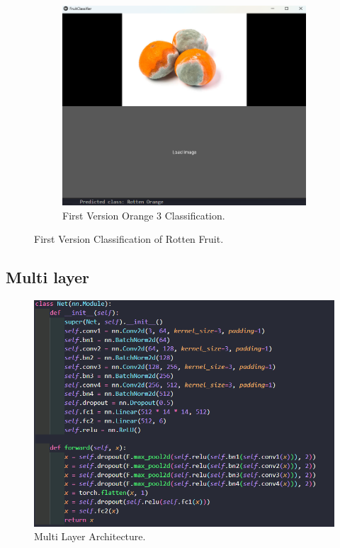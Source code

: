 \documentclass[conference]{IEEEtran}
\begin{document}
\begin{figure}[h]
\begin{subfigure}[b]{0.48\linewidth}
        \label{figFB}
    \end{subfigure}
    \hfill
    \begin{subfigure}[b]{0.48\linewidth}
        \centering
        \includegraphics[width=\linewidth]{1layer orageR3.png}
        \caption{First Version Orange 3 Classification.}
        \label{figFB}
    \end{subfigure}
    \caption{First Version Classification of Rotten Fruit.}
    \label{Fig1R}
\end{figure}
\clearpage

\subsection{Multi layer}

\begin{figure}[h]
    \centering
    \includegraphics[width=\linewidth]{multi architecture.png}
    \caption{Multi Layer Architecture.}
    \label{figMl}
\end{figure}
\end{document}
